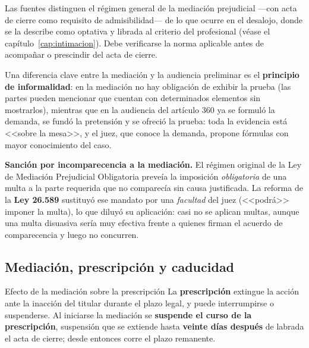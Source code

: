 \documentclass[12pt,oneside]{book}
\begin{document}
\begin{note}
Las fuentes distinguen el régimen general de la mediación prejudicial ---con acta de cierre como requisito de admisibilidad--- de lo que ocurre en el desalojo, donde se la describe como optativa y librada al criterio del profesional (véase el capítulo~\ref{cap:intimacion}). Debe verificarse la norma aplicable antes de acompañar o prescindir del acta de cierre.
\end{note}

\begin{note}
Una diferencia clave entre la mediación y la audiencia preliminar es el \textbf{principio de informalidad}: en la mediación no hay obligación de exhibir la prueba (las partes pueden mencionar que cuentan con determinados elementos sin mostrarlos), mientras que en la audiencia del artículo 360 ya se formuló la demanda, se fundó la pretensión y se ofreció la prueba: toda la evidencia está <<sobre la mesa>>, y el juez, que conoce la demanda, propone fórmulas con mayor conocimiento del caso.
\end{note}

\begin{normacitada}
\textbf{Sanción por incomparecencia a la mediación.} El régimen original de la Ley de Mediación Prejudicial Obligatoria preveía la imposición \emph{obligatoria} de una multa a la parte requerida que no comparecía sin causa justificada. La reforma de la \textbf{Ley 26.589} sustituyó ese mandato por una \emph{facultad} del juez (<<podrá>> imponer la multa), lo que diluyó su aplicación: casi no se aplican multas, aunque una multa disuasiva sería muy efectiva frente a quienes firman el acuerdo de comparecencia y luego no concurren.
\end{normacitada}

\subsection{Mediación, prescripción y caducidad}

\begin{definition}{Efecto de la mediación sobre la prescripción}
La \textbf{prescripción} extingue la acción ante la inacción del titular durante el plazo legal, y puede interrumpirse o suspenderse. Al iniciarse la mediación se \textbf{suspende el curso de la prescripción}, suspensión que se extiende hasta \textbf{veinte días después} de labrada el acta de cierre; desde entonces corre el plazo remanente.
\end{definition}
\end{document}
